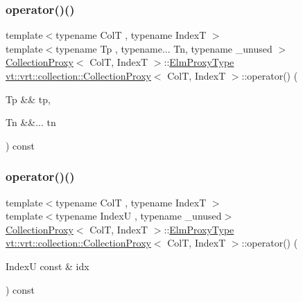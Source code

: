 \subsubsection{\texorpdfstring{operator()()}{operator()()}\hspace{0.1cm}{\footnotesize\ttfamily [1/2]}}
{\footnotesize\ttfamily template$<$typename ColT , typename IndexT $>$ \\
template$<$typename Tp , typename... Tn, typename \+\_\+unused $>$ \\
\hyperlink{structvt_1_1vrt_1_1collection_1_1_collection_proxy}{Collection\+Proxy}$<$ ColT, IndexT $>$\+::\hyperlink{structvt_1_1vrt_1_1collection_1_1_collection_proxy_a892c21eae1dca37321d7973f72b55b0a}{Elm\+Proxy\+Type} \hyperlink{structvt_1_1vrt_1_1collection_1_1_collection_proxy}{vt\+::vrt\+::collection\+::\+Collection\+Proxy}$<$ ColT, IndexT $>$\+::operator() (\begin{DoxyParamCaption}\item[{Tp \&\&}]{tp,  }\item[{Tn \&\&...}]{tn }\end{DoxyParamCaption}) const}

\mbox{\label{structvt_1_1vrt_1_1collection_1_1_collection_proxy_a53d97b9ca0294b4254556620463708d9}} 
\subsubsection{\texorpdfstring{operator()()}{operator()()}\hspace{0.1cm}{\footnotesize\ttfamily [2/2]}}
{\footnotesize\ttfamily template$<$typename ColT , typename IndexT $>$ \\
template$<$typename IndexU , typename \+\_\+unused$>$ \\
\hyperlink{structvt_1_1vrt_1_1collection_1_1_collection_proxy}{Collection\+Proxy}$<$ ColT, IndexT $>$\+::\hyperlink{structvt_1_1vrt_1_1collection_1_1_collection_proxy_a892c21eae1dca37321d7973f72b55b0a}{Elm\+Proxy\+Type} \hyperlink{structvt_1_1vrt_1_1collection_1_1_collection_proxy}{vt\+::vrt\+::collection\+::\+Collection\+Proxy}$<$ ColT, IndexT $>$\+::operator() (\begin{DoxyParamCaption}\item[{IndexU const \&}]{idx }\end{DoxyParamCaption}) const}

